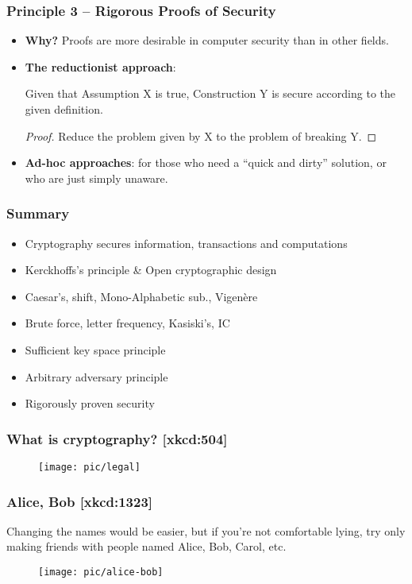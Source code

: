 \begin{frame}\frametitle{Principle 3 -- Rigorous Proofs of Security}
\begin{itemize}
\item \textbf{Why?} Proofs are more desirable in computer security than in other fields.
\item \textbf{The reductionist approach}: 
\begin{theorem}	Given that Assumption X is true, Construction Y is secure according to the given definition.
\end{theorem}
\begin{proof} Reduce the problem given by X to the problem of breaking Y.
\end{proof}
\item \textbf{Ad-hoc approaches}: for those who need a ``quick and dirty'' solution, or who are just simply unaware.
\end{itemize}
\end{frame}
\begin{frame}\frametitle{Summary}
\begin{itemize}
\item Cryptography secures information, transactions and computations
\item Kerckhoffs's principle \& Open cryptographic design
\item Caesar's, shift, Mono-Alphabetic sub., Vigen\`{e}re
\item Brute force, letter frequency, Kasiski's, IC
\item Sufficient key space principle
\item Arbitrary adversary principle
\item Rigorously proven security
\end{itemize}
\end{frame}
\begin{frame}\frametitle{What is cryptography? [xkcd:504]}
\begin{figure}
\begin{center}
\texttt{[image: pic/legal]} 
\end{center}
\end{figure}
\end{frame}
\begin{frame}\frametitle{Alice, Bob  [xkcd:1323]}
Changing the names would be easier, but if you're not comfortable lying, try only making friends with people named Alice, Bob, Carol, etc.
\begin{figure}
\begin{center}
\texttt{[image: pic/alice-bob]} 
\end{center}
\end{figure}
\end{frame}



